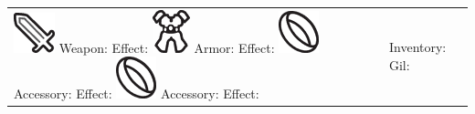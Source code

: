 \begin{tabularx}{\columnwidth}{XX}
	\noindent \newline
	\includegraphics[height=0.6\baselineskip]{./art/icons/weapon.png} Weapon:  \newline 
	\indent Effect:  \newline \newline
	\includegraphics[height=0.6\baselineskip]{./art/icons/armor.png} Armor: \newline
	\indent Effect:  \newline \newline
	\includegraphics[height=0.6\baselineskip]{./art/icons/acc.png} Accessory: \newline
	\indent Effect: \newline \newline
	\includegraphics[height=0.6\baselineskip]{./art/icons/acc.png} Accessory: \newline
	\indent Effect: \newline
	&
	\noindent \newline
	\indent Inventory: \hfill Gil: \phantom{9999} \hspace{1cm} \newline \newline
\end{tabularx}

